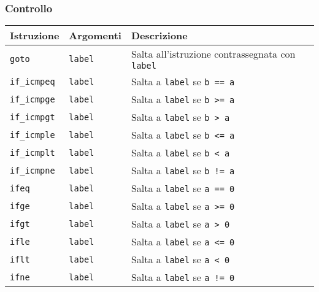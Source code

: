 \subsubsection*{Controllo}
\label{sec:controllo}
{\footnotesize
\begin{longtable}{p{2cm} p{2cm} p{6.5cm}}
\toprule
\rowcolor[gray]{0.9}
  \textbf{Istruzione} &
  \textbf{Argomenti} &
  \textbf{Descrizione} \\
\toprule
\endhead
  \texttt{goto} &
  \texttt{label} &
  Salta all'istruzione contrassegnata con \texttt{label} \\
  
  \texttt{if\_icmpeq} &
  \texttt{label} &
  Salta a \texttt{label} se \texttt{b == a} \\
  
  \texttt{if\_icmpge} &
  \texttt{label} &
  Salta a \texttt{label} se \texttt{b >= a} \\
  
  \texttt{if\_icmpgt} &
  \texttt{label} &
  Salta a \texttt{label} se \texttt{b > a} \\
  
  \texttt{if\_icmple} &
  \texttt{label} &
  Salta a \texttt{label} se \texttt{b <= a} \\
  
  \texttt{if\_icmplt} &
  \texttt{label} &
  Salta a \texttt{label} se \texttt{b < a} \\
  
  \texttt{if\_icmpne} &
  \texttt{label} &
  Salta a \texttt{label} se \texttt{b != a} \\
  
  \texttt{ifeq} &
  \texttt{label} &
  Salta a \texttt{label} se \texttt{a == 0} \\
  
  \texttt{ifge} &
  \texttt{label} &
  Salta a \texttt{label} se \texttt{a >= 0} \\
  
  \texttt{ifgt} &
  \texttt{label} &
  Salta a \texttt{label} se \texttt{a > 0} \\
  
  \texttt{ifle} &
  \texttt{label} &
  Salta a \texttt{label} se \texttt{a <= 0} \\
  
  \texttt{iflt} &
  \texttt{label} &
  Salta a \texttt{label} se \texttt{a < 0} \\
  
  \texttt{ifne} &
  \texttt{label} &
  Salta a \texttt{label} se \texttt{a != 0} \\
  

\end{longtable}}
